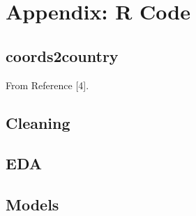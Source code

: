\documentclass{article}
\begin{document}
\section{Appendix: R Code}

\subsection{coords2country}
From Reference [4].



\subsection{Cleaning}


\subsection{EDA}


\subsection{Models}

\end{document}
